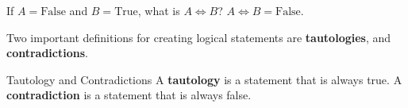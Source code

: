 \begin{boxexample}{}{}
	If $A=\text{False}$ and $B=\text{True}$, what is $A \iff B$? $A \iff B = \text{False}$.
\end{boxexample}

Two important definitions for creating logical statements are {\bf tautologies}, and {\bf contradictions}.

\begin{boxdefine}{Tautology and Contradictions}{}
	A {\bf tautology} is a statement that is always true. A {\bf contradiction} is a statement that is always false.
\end{boxdefine}
